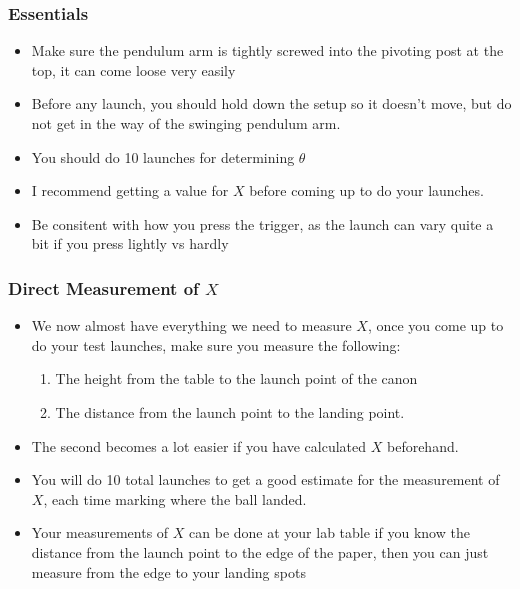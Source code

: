 \documentclass[aspectratio=169]{beamer}
\begin{document}
\begin{frame}
  \frametitle{Essentials}
  \begin{itemize}
  \item Make sure the pendulum arm is tightly screwed into the pivoting post at the top, it can come loose very easily
  \item Before any launch, you should hold down the setup so it doesn't move, but do not get in the way of the swinging pendulum arm.
  \item You should do 10 launches for determining $\theta$
  \item I recommend getting a value for $X$ before coming up to do your launches.
  \item Be consitent with how you press the trigger, as the launch can vary quite a bit if you press lightly vs hardly
  \end{itemize}
\end{frame}

\begin{frame}
  \frametitle{Direct Measurement of $X$}
  \begin{itemize}
  \item We now almost have everything we need to measure $X$, once you come up to do your test launches, make sure you measure the following:
    \begin{enumerate}
    \item The height from the table to the launch point of the canon
    \item The distance from the launch point to the landing point.
    \end{enumerate}
  \item The second becomes a lot easier if you have calculated $X$ beforehand. 
  \item You will do 10 total launches to get a good estimate for the measurement of $X$, each time marking where the ball landed.
  \item Your measurements of $X$ can be done at your lab table if you know the distance from the launch point to the edge of the paper, then you can just measure from the edge to your landing spots
  \end{itemize}
\end{frame}
\end{document}

